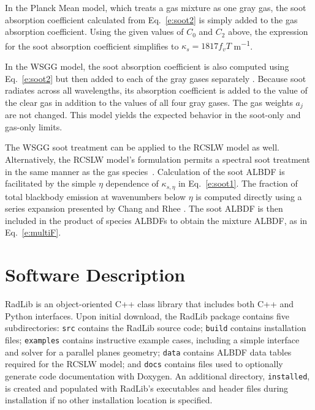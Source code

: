 \documentclass[preprint,12pt]{elsarticle}
\newcounter{bla}
\begin{document}
In the Planck Mean model, which treats a gas mixture as one gray gas, the soot absorption coefficient calculated from Eq.~\ref{e:soot2} is simply added to the gas absorption coefficient. Using the given values of $C_0$ and $C_2$ above, the expression for the soot absorption coefficient simplifies to  $\kappa_s=1817f_vT$ \si{m^{-1}}.
 
In the WSGG model, the soot absorption coefficient is also computed using Eq.~\ref{e:soot2} but then added to each of the gray gases separately \cite{Bordbar_personal}. Because soot radiates across all wavelengths, its absorption coefficient is added to the value of the clear gas in addition to the values of all four gray gases. The gas weights $a_j$ are not changed. This model yields the expected behavior in the soot-only and gas-only limits.

The WSGG soot treatment can be applied to the RCSLW model as well. Alternatively, the RCSLW model's formulation permits a spectral soot treatment in the same manner as the gas species~\cite{Solovjov_2001}. Calculation of the soot ALBDF is facilitated by the simple $\eta$ dependence of $\kappa_{s,\eta}$ in Eq.~\ref{e:soot1}. The fraction of total blackbody emission at wavenumbers below $\eta$ is computed directly using a series expansion presented by Chang and Rhee \cite{Chang_1984}. The soot ALBDF is then included in the product of species ALBDFs to obtain the mixture ALBDF, as in Eq.~\ref{e:multiF}. 

 

\section{Software Description} \label{s:architechture}

RadLib is an object-oriented C++ class library that includes both C++ and Python interfaces. Upon initial download, the RadLib package contains five subdirectories: \texttt{src} contains the RadLib source code; \texttt{build} contains installation files; \texttt{examples} contains instructive example cases, including a simple interface and solver for a parallel planes geometry; \texttt{data} contains ALBDF data tables required for the RCSLW model; and \texttt{docs} contains files used to optionally generate code documentation with Doxygen. An additional directory, \texttt{installed}, is created and populated with RadLib's executables and header files during installation if no other installation location is specified.
\end{document}
